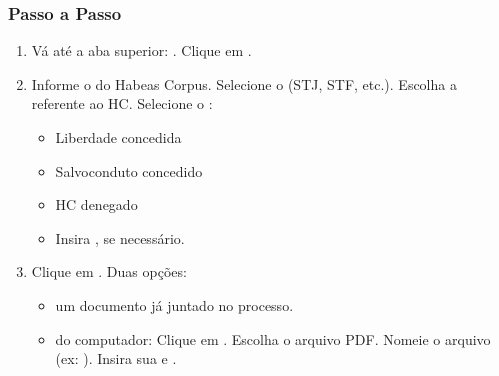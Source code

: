 \documentclass[letterpaper,10pt,brazil]{sphinxmanual}
\begin{document}
\subsubsection{Passo a Passo}
\label{\detokenize{projud_59_juntadahabeascorpus:passo-a-passo}}\begin{enumerate}
%
\item {} 
\sphinxAtStartPar
{}
\sphinxhyphen{} Vá até a aba superior: .
\sphinxhyphen{} Clique em .

\item {} 
\sphinxAtStartPar
{}
\sphinxhyphen{} Informe o  do Habeas Corpus.
\sphinxhyphen{} Selecione o  (STJ, STF, etc.).
\sphinxhyphen{} Escolha a  referente ao HC.
\sphinxhyphen{} Selecione o :
\begin{itemize}
\item {} 
\sphinxAtStartPar
Liberdade concedida

\item {} 
\sphinxAtStartPar
Salvo\sphinxhyphen{}conduto concedido

\item {} 
\sphinxAtStartPar
HC denegado

\end{itemize}
\begin{itemize}
\item {} 
\sphinxAtStartPar
Insira , se necessário.

\end{itemize}

\item {} 
\sphinxAtStartPar
{}
\sphinxhyphen{} Clique em .
\sphinxhyphen{} Duas opções:
\begin{itemize}
\item {} 
\sphinxAtStartPar
{} um documento já juntado no processo.

\item {} 
\sphinxAtStartPar
{} do computador:
\sphinxhyphen{} Clique em .
\sphinxhyphen{} Escolha o arquivo PDF.
\sphinxhyphen{} Nomeie o arquivo (ex: ).
\sphinxhyphen{} Insira sua  e .


\end{itemize}
\end{enumerate}
\end{document}
